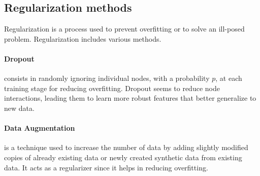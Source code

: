 \documentclass{standalone}
\begin{document}
\subsection{Regularization methods}
Regularization is a process used to prevent overfitting or to solve an ill-posed problem.
Regularization includes various methods.

\paragraph{Dropout}
consists in randomly ignoring individual nodes, with a probability $p$, at each training stage for reducing overfitting.
Dropout seems to reduce node interactions, leading them to learn more robust features that better generalize to new data\cite{wiki:cnn}.

\paragraph{Data Augmentation}
is a technique used to increase the number of data by adding slightly modified copies of already existing data or newly created synthetic data from existing data.
It acts as a regularizer since it helps in reducing overfitting\cite{wiki:cnn}.
\end{document}
